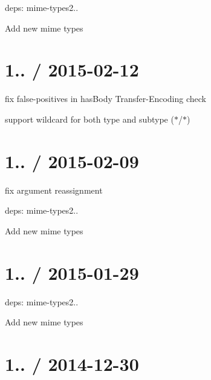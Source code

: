 
\begin{DoxyItemize}
\item deps\+: mime-\/types2..
\begin{DoxyItemize}
\item Add new mime types
\end{DoxyItemize}
\end{DoxyItemize}

\section*{1.. / 2015-\/02-\/12 }


\begin{DoxyItemize}
\item fix false-\/positives in {\ttfamily has\+Body} {\ttfamily Transfer-\/\+Encoding} check
\item support wildcard for both type and subtype ({\ttfamily $\ast$/$\ast$})
\end{DoxyItemize}

\section*{1.. / 2015-\/02-\/09 }


\begin{DoxyItemize}
\item fix argument reassignment
\item deps\+: mime-\/types2..
\begin{DoxyItemize}
\item Add new mime types
\end{DoxyItemize}
\end{DoxyItemize}

\section*{1.. / 2015-\/01-\/29 }


\begin{DoxyItemize}
\item deps\+: mime-\/types2..
\begin{DoxyItemize}
\item Add new mime types
\end{DoxyItemize}
\end{DoxyItemize}

\section*{1.. / 2014-\/12-\/30 }


